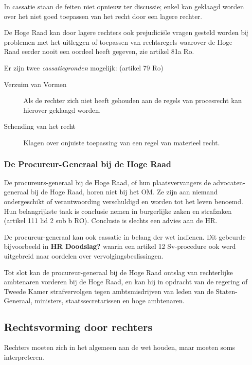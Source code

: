 \documentclass{article}
\begin{document}
In cassatie staan de feiten niet opnieuw ter discussie; enkel kan geklaagd
worden over het niet goed toepassen van het recht door een lagere rechter. 

De Hoge Raad kan door lagere rechters ook prejudiciële vragen gesteld worden
bij problemen met het uitleggen of toepassen van rechtsregels waarover de Hoge
Raad eerder nooit een oordeel heeft gegeven, zie artikel 81a Ro. 

Er zijn twee \emph{cassatiegronden} mogelijk: (artikel 79 Ro)

\begin{description}
  \item[Verzuim van Vormen] Als de rechter zich niet heeft gehouden aan de regels van
    procesrecht kan hierover geklaagd worden.
  \item[Schending van het recht] Klagen over onjuiste toepassing van een regel van 
    materieel recht. 
\end{description}

\subsubsection{De Procureur-Generaal bij de Hoge Raad}

De procureurs-generaal bij de Hoge Raad, of hun plaatsvervangers de
advocaten-generaal bij de Hoge Raad, horen niet bij het OM. Ze zijn aan niemand
ondergeschikt of verantwoording verschuldigd en worden tot het leven benoemd.
Hun belangrijkste taak is conclusie nemen in burgerlijke zaken en strafzaken
(artikel 111 lid 2 sub b RO). Conclusie is slechts een advies aan de HR.

De procureur-generaal kan ook cassatie in belang der wet indienen. Dit gebeurde
bijvoorbeeld in \textbf{HR Doodslag?} waarin een artikel 12 Sv-procedure ook
werd uitgebreid naar oordelen over vervolgingsbeslissingen.

Tot slot kan de procureur-generaal bij de Hoge Raad ontslag van rechterlijke
ambtenaren vorderen bij de Hoge Raad, en kan hij in opdracht van de regering of
Tweede Kamer strafvervolgen tegen ambtsmisdrijven van leden van de
Staten-Generaal, ministers, staatssecretarissen en hoge ambtenaren.

\subsection{Rechtsvorming door rechters}

Rechters moeten zich in het algemeen aan de wet houden, maar moeten soms interpreteren.
\end{document}
